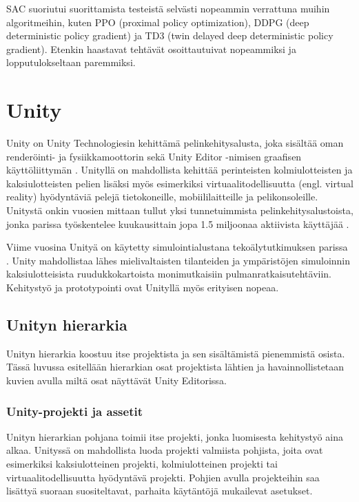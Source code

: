 \documentclass[utf8]{gradu3}
\begin{document}
SAC suoriutui \textcite{haarnoja2018app} suorittamista testeistä selvästi nopeammin verrattuna muihin algoritmeihin, kuten PPO (proximal policy optimization), DDPG (deep deterministic policy gradient) ja TD3 (twin delayed deep deterministic policy gradient). Etenkin haastavat tehtävät osoittautuivat nopeammiksi ja lopputulokseltaan paremmiksi.

\chapter{Unity}
\label{unity}

Unity on Unity Technologiesin kehittämä pelinkehitysalusta, joka sisältää oman renderöinti- ja fysiikkamoottorin sekä Unity Editor -nimisen graafisen käyttöliittymän \parencite{juliani2018unity}. Unityllä on mahdollista kehittää perinteisten kolmiulotteisten ja kaksiulotteisten pelien lisäksi myös esimerkiksi virtuaalitodellisuutta (engl. virtual reality) hyödyntäviä pelejä tietokoneille, mobiililaitteille ja pelikonsoleille. Unitystä onkin vuosien mittaan tullut yksi tunnetuimmista pelinkehitysalustoista, jonka parissa työskentelee kuukausittain jopa 1.5 miljoonaa aktiivista käyttäjää \parencite{unityweb}.

Viime vuosina Unityä on käytetty simulointialustana tekoälytutkimuksen parissa \parencite{juliani2018unity}. Unity mahdollistaa lähes mielivaltaisten tilanteiden ja ympäristöjen simuloinnin kaksiulotteisista ruudukkokartoista monimutkaisiin pulmanratkaisutehtäviin. Kehitystyö ja prototypointi ovat Unityllä myös erityisen nopeaa.

\section{Unityn hierarkia}

Unityn hierarkia koostuu itse projektista ja sen sisältämistä pienemmistä osista. Tässä luvussa esitellään hierarkian osat projektista lähtien ja havainnollistetaan kuvien avulla miltä osat näyttävät Unity Editorissa.

\subsection{Unity-projekti ja assetit}

Unityn hierarkian pohjana toimii itse projekti, jonka luomisesta kehitystyö aina alkaa. Unityssä on mahdollista luoda projekti valmiista pohjista, joita ovat esimerkiksi kaksiulotteinen projekti, kolmiulotteinen projekti tai virtuaalitodellisuutta hyödyntävä projekti. Pohjien avulla projekteihin saa lisättyä suoraan suositeltavat, parhaita käytäntöjä mukailevat asetukset.
\end{document}
